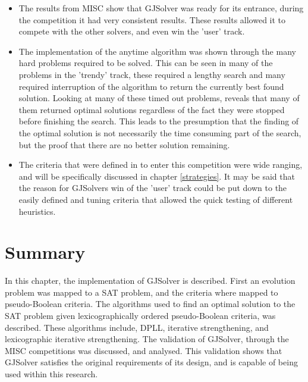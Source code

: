 \begin{itemize}
  \item The results from MISC show that GJSolver was ready for its entrance, during the competition it had very consistent results.
These results allowed it to compete with the other solvers, and even win the 'user' track.
\item The implementation of the anytime algorithm was shown through the many hard problems required to be solved.
This can be seen in many of the problems in the 'trendy' track, these required a lengthy search and many required interruption of the algorithm to return the currently best found solution.
Looking at many of these timed out problems, reveals that many of them returned optimal solutions regardless of the fact they were stopped before finishing the search.
This leads to the presumption that the finding of the optimal solution is not necessarily the time consuming part of the search, but the proof that there are no better solution remaining.
\item The criteria that were defined in to enter this competition were wide ranging, and will be specifically discussed in chapter \ref{strategies}.
It may be said that the reason for GJSolvers win of the 'user' track could be put down to the easily defined and tuning criteria that allowed the quick testing of different heuristics.
\end{itemize}

\section{Summary}
In this chapter, the implementation of GJSolver is described. 
First an evolution problem was mapped to a SAT problem, and the criteria where mapped to pseudo-Boolean criteria.
The algorithms used to find an optimal solution to the SAT problem given lexicographically ordered pseudo-Boolean criteria, was described.
These algorithms include, DPLL, iterative strengthening, and lexicographic iterative strengthening.
The validation of GJSolver, through the MISC competitions was discussed, and analysed.
This validation shows that GJSolver satisfies the original requirements of its design, and is capable of being used within this research. 
